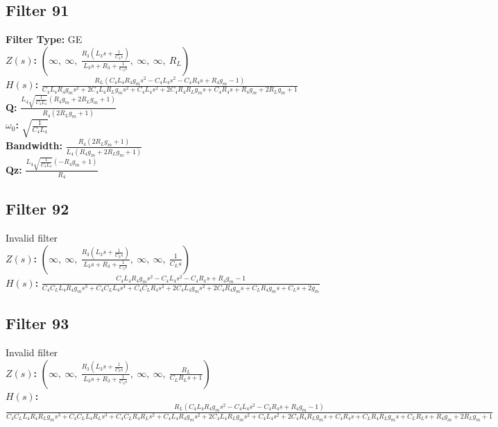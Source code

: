 \documentclass{article}
\begin{document}
\subsection*{Filter 91}
\textbf{Filter Type:} GE \\ 
\textbf{$Z(s)$:} $\left( \infty, \  \infty, \  \frac{R_{3} \left(L_{3} s + \frac{1}{C_{3} s}\right)}{L_{3} s + R_{3} + \frac{1}{C_{3} s}}, \  \infty, \  \infty, \  R_{L}\right)$ \\ 
\textbf{$H(s)$:} $\frac{R_{L} \left(C_{4} L_{4} R_{4} g_{m} s^{2} - C_{4} L_{4} s^{2} - C_{4} R_{4} s + R_{4} g_{m} - 1\right)}{C_{4} L_{4} R_{4} g_{m} s^{2} + 2 C_{4} L_{4} R_{L} g_{m} s^{2} + C_{4} L_{4} s^{2} + 2 C_{4} R_{4} R_{L} g_{m} s + C_{4} R_{4} s + R_{4} g_{m} + 2 R_{L} g_{m} + 1}$ \\ 
\textbf{Q:} $\frac{L_{4} \sqrt{\frac{1}{C_{4} L_{4}}} \left(R_{4} g_{m} + 2 R_{L} g_{m} + 1\right)}{R_{4} \left(2 R_{L} g_{m} + 1\right)}$ \\ 
\textbf{$\omega_0$:} $\sqrt{\frac{1}{C_{4} L_{4}}}$ \\ 
\textbf{Bandwidth:} $\frac{R_{4} \left(2 R_{L} g_{m} + 1\right)}{L_{4} \left(R_{4} g_{m} + 2 R_{L} g_{m} + 1\right)}$ \\ 
\textbf{Qz:} $\frac{L_{4} \sqrt{\frac{1}{C_{4} L_{4}}} \left(- R_{4} g_{m} + 1\right)}{R_{4}}$ \\ 
\subsection*{Filter 92}
Invalid filter \\ 
\textbf{$Z(s)$:} $\left( \infty, \  \infty, \  \frac{R_{3} \left(L_{3} s + \frac{1}{C_{3} s}\right)}{L_{3} s + R_{3} + \frac{1}{C_{3} s}}, \  \infty, \  \infty, \  \frac{1}{C_{L} s}\right)$ \\ 
\textbf{$H(s)$:} $\frac{C_{4} L_{4} R_{4} g_{m} s^{2} - C_{4} L_{4} s^{2} - C_{4} R_{4} s + R_{4} g_{m} - 1}{C_{4} C_{L} L_{4} R_{4} g_{m} s^{3} + C_{4} C_{L} L_{4} s^{3} + C_{4} C_{L} R_{4} s^{2} + 2 C_{4} L_{4} g_{m} s^{2} + 2 C_{4} R_{4} g_{m} s + C_{L} R_{4} g_{m} s + C_{L} s + 2 g_{m}}$ \\ 
\subsection*{Filter 93}
Invalid filter \\ 
\textbf{$Z(s)$:} $\left( \infty, \  \infty, \  \frac{R_{3} \left(L_{3} s + \frac{1}{C_{3} s}\right)}{L_{3} s + R_{3} + \frac{1}{C_{3} s}}, \  \infty, \  \infty, \  \frac{R_{L}}{C_{L} R_{L} s + 1}\right)$ \\ 
\textbf{$H(s)$:} $\frac{R_{L} \left(C_{4} L_{4} R_{4} g_{m} s^{2} - C_{4} L_{4} s^{2} - C_{4} R_{4} s + R_{4} g_{m} - 1\right)}{C_{4} C_{L} L_{4} R_{4} R_{L} g_{m} s^{3} + C_{4} C_{L} L_{4} R_{L} s^{3} + C_{4} C_{L} R_{4} R_{L} s^{2} + C_{4} L_{4} R_{4} g_{m} s^{2} + 2 C_{4} L_{4} R_{L} g_{m} s^{2} + C_{4} L_{4} s^{2} + 2 C_{4} R_{4} R_{L} g_{m} s + C_{4} R_{4} s + C_{L} R_{4} R_{L} g_{m} s + C_{L} R_{L} s + R_{4} g_{m} + 2 R_{L} g_{m} + 1}$ \\ 
\end{document}
